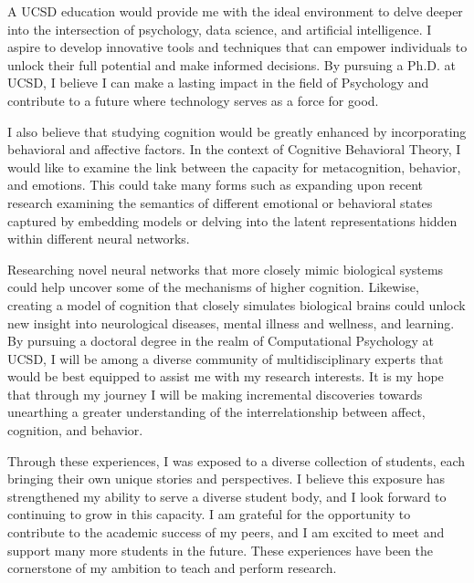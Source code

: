 \documentclass[10pt]{article}
\begin{document}
A UCSD education would provide me with the ideal environment to delve deeper into the intersection of psychology, data science, and
artificial intelligence. I aspire to develop innovative tools and techniques that can empower individuals to unlock their full potential
and make informed decisions. By pursuing a Ph.D. at UCSD, I believe I can make a lasting impact in the field of Psychology and contribute
to a future where technology serves as a force for good.

I also believe that studying cognition would be greatly enhanced by incorporating behavioral and affective factors. In the context of
Cognitive Behavioral Theory, I would like to examine the link between the capacity for metacognition, behavior, and emotions. This could
take many forms such as expanding upon recent research examining the semantics of different emotional or behavioral states captured by
embedding models or delving into the latent representations hidden within different neural networks.

Researching novel neural networks that more closely mimic biological systems could help uncover some of the mechanisms of higher cognition.
Likewise, creating a model of cognition that closely simulates biological brains could unlock new insight into neurological diseases,
mental illness and wellness, and learning. By pursuing a doctoral degree in the realm of Computational Psychology at UCSD, I will be among
a diverse community of multidisciplinary experts that would be best equipped to assist me with my research interests. It is my hope that
through my journey I will be making incremental discoveries towards unearthing a greater understanding of the interrelationship between
affect, cognition, and behavior.

Through these experiences, I was exposed to a diverse collection of students, each bringing their own unique stories and perspectives. I
believe this exposure has strengthened my ability to serve a diverse student body, and I look forward to continuing to grow in this
capacity. I am grateful for the opportunity to contribute to the academic success of my peers, and I am excited to meet and support many
more students in the future. These experiences have been the cornerstone of my ambition to teach and perform research.
\end{document}
